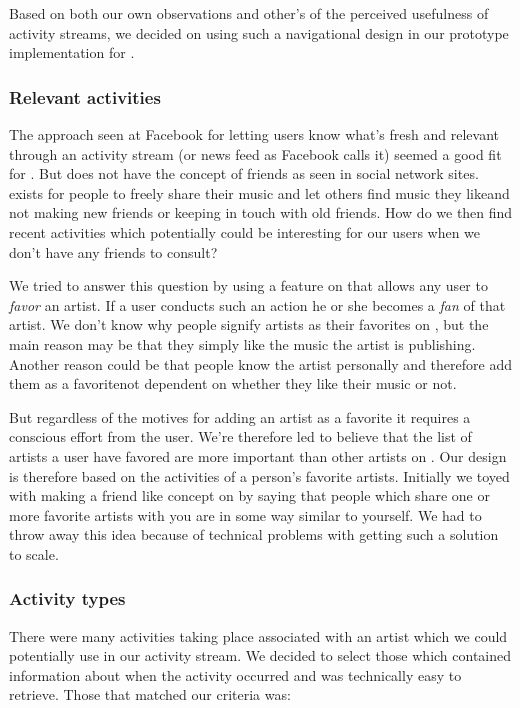 Based on both our own observations and other's of the perceived usefulness
of activity streams, we decided on using such a navigational design in
our prototype implementation for \urort{}.

\subsubsection{Relevant activities}

The approach seen at Facebook for letting users know what's fresh and relevant
through an activity stream (or news feed as Facebook calls it)
seemed a good fit for \urort{}. But
\urort{} does not have the concept of friends as seen in social network sites.
\urort{} exists for people to freely share their music and let others find
music they like\dash{}and not making new friends or keeping in touch with
old friends. How do we then find recent activities which potentially could be
interesting for our users when we don't have any friends to consult?

We tried to answer this question by using a feature on \urort{} that allows
any user to \emph{favor} an artist. If a user conducts such an action he or
she becomes a \emph{fan} of that artist. We don't know why people signify
artists as their favorites on \urort{}, but the main reason may be that
they simply like the music the artist is publishing.
Another reason could be that people know the artist personally and therefore
add them as a favorite\dash{}not dependent on whether they like their music or
not.

But regardless of the motives for adding an artist as a favorite it requires
a conscious effort from the user. We're therefore led to believe that the list
of artists a user have favored are more important than other artists on
\urort{}. Our design is therefore based on the activities of a person's
favorite artists. Initially we toyed with making a friend like concept on
\urort{} by saying that people which share one or more favorite artists with
you are in some way similar to yourself. We had to throw away this idea
because of technical problems with getting such a solution to scale.

\subsubsection{Activity types}

There were many activities taking place associated with an artist
which we could potentially use in our activity stream. We decided to select
those which contained information about when the activity occurred and was
technically easy%
to retrieve. Those that matched our criteria was:

